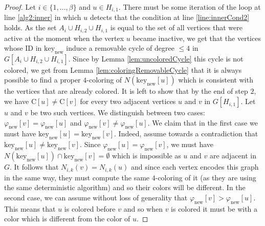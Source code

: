 \documentclass{article}
\theoremstyle{definition}
\newtheorem{lemma}{Lemma}[section]
\begin{document}
\begin{proof} Let $i \in \{1, ..., \beta\}$ and $u \in H_{i,1}$. There must be some iteration of the loop at line \ref{alg2:inner} in which $u$ detects that the condition at line \ref{line:innerCond2} holds. As the set $A_i \cup H_{i,2} \cup H_{i,1}$ is equal to the set of all vertices that were active at the moment when the vertex $u$ became inactive, we get that the vertices whose ID in $\text{key}_{\text{new}}$ induce a removable cycle of degree $\le 4$ in $G[A_i \cup H_{i,2} \cup H_{i,1}]$. Since by Lemma \ref{lem:uncoloredCycle} this cycle is not colored, we get from Lemma \ref{lem:coloringRemovableCycle} that it is always possible to find a proper $4$-coloring of $N(\text{key}_{\text{new}}[u])$ which is consistent with the vertices that are already colored. It is left to show that by the end of step $2$, we have $\text{C}[u] \ne \text{C}[v]$ for every two adjacent vertices $u$ and $v$ in $G[H_{i,1}]$. Let $u$ and $v$ be two such vertices. We distinguish between two cases: $\varphi_{\text{new}}[v] = \varphi_{\text{new}}[u]$ and $\varphi_{\text{new}}[v] \ne \varphi_{\text{new}}[u]$. We claim that in the first case we must have $\text{key}_{\text{new}}[u] = \text{key}_{\text{new}}[v]$. Indeed, assume towards a contradiction that $\text{key}_{\text{new}}[u] \ne \text{key}_{\text{new}}[v]$. Since $\varphi_{\text{new}}[u] = \varphi_{\text{new}}[v]$, we must have $N(\text{key}_{\text{new}}[u]) \cap \text{key}_{\text{new}}[v] = \emptyset$ which is impossible as $u$ and $v$ are adjacent in $G$. It follows that $N_{i,k}(v) = N_{i,k}(u)$ and since each vertex encodes this graph in the same way, they must compute the same $4$-coloring of it (as they are using the same deterministic algorithm) and so their colors will be different. In the second case, we can assume without loss of generality that $\varphi_{\text{new}}[v] > \varphi_{\text{new}}[u]$. This means that $u$ is colored before $v$ and so when $v$ is colored it must be with a color which is different from the color of $u$.\end{proof}


\end{document}
